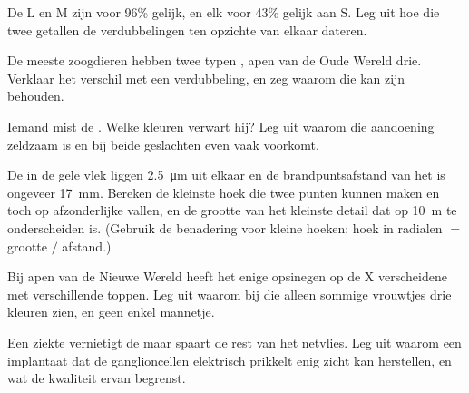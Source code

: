 \begin{exercise}[$\star\star$]\label{exo:g11:the-eye:10}
De  L en M zijn voor 96\% gelijk, en elk voor 43\% gelijk aan S. Leg
uit hoe die twee getallen de verdubbelingen ten opzichte van elkaar
dateren.
\end{exercise}

\begin{exercise}[$\star\star$]\label{exo:g11:the-eye:11}
De meeste zoogdieren hebben twee typen , apen van de Oude
Wereld drie. Verklaar het verschil met een verdubbeling, en zeg waarom
die kan zijn behouden.
\end{exercise}

\begin{exercise}[$\star\star\star$]\label{exo:g11:the-eye:12}
Iemand mist de . Welke kleuren verwart hij? Leg uit waarom die
aandoening zeldzaam is en bij beide geslachten even vaak voorkomt.
\end{exercise}

\begin{exercise}[$\star\star\star$]\label{exo:g11:the-eye:13}
De  in de gele vlek liggen \qty{2.5}{\micro m} uit elkaar en de
brandpuntsafstand van het  is ongeveer \qty{17}{mm}. Bereken de
kleinste hoek die twee punten kunnen maken en toch op afzonderlijke
 vallen, en de grootte van het kleinste detail dat op
\qty{10}{m} te onderscheiden is. (Gebruik de benadering voor kleine
hoeken: hoek in radialen $=$ grootte $/$ afstand.)
\end{exercise}

\begin{exercise}[$\star\star\star$]\label{exo:g11:the-eye:14}
Bij apen van de Nieuwe Wereld heeft het enige opsinegen op de X
verscheidene  met verschillende toppen. Leg uit waarom bij die
 alleen sommige vrouwtjes drie kleuren zien, en geen enkel
mannetje.
\end{exercise}

\begin{exercise}[$\star\star\star$]\label{exo:g11:the-eye:15}
Een ziekte vernietigt de  maar spaart de rest van het
netvlies. Leg uit waarom een implantaat dat de ganglioncellen elektrisch
prikkelt enig zicht kan herstellen, en wat de kwaliteit ervan begrenst.
\end{exercise}

